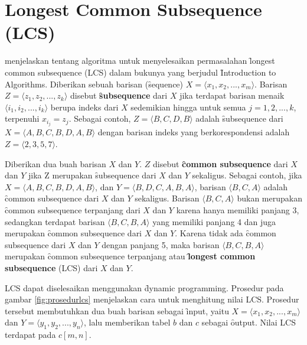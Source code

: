 \section{Longest Common Subsequence (LCS)}\label{lcs}
\cite{Cormen:2009:IAT:1614191} menjelaskan tentang algoritma untuk menyelesaikan permasalahan \f{longest common subsequence} (LCS) dalam bukunya yang berjudul \f{Introduction to Algorithms}. Diberikan sebuah barisan (\f{sequence}) $X=\langle x_1,x_2,...,x_m\rangle$. Barisan $Z=\langle z_1,z_2,...,z_k\rangle$ disebut \textbf{\f{subsequence}} dari $X$ jika terdapat barisan menaik $\langle i_1,i_2,...,i_k\rangle$ berupa indeks dari $X$ sedemikian hingga untuk semua $j=1,2,...,k$, terpenuhi $x_{i_j}=z_j$. Sebagai contoh, $Z=\langle B,C,D,B\rangle$ adalah \f{subsequence} dari $X=\langle A,B,C,B,D,A,B\rangle$ dengan barisan indeks yang berkorespondensi adalah $Z=\langle 2,3,5,7\rangle$.

Diberikan dua buah barisan $X$ dan $Y$. $Z$ disebut \textbf{\f{common subsequence}} dari $X$ dan $Y$ jika Z merupakan \f{subsequence} dari $X$ dan $Y$ sekaligus. Sebagai contoh,  jika $X=\langle A,B,C,B,D,A,B\rangle$, dan $Y=\langle B,D,C,A,B,A\rangle$, barisan $\langle B,C,A\rangle$ adalah \f{common subsequence} dari $X$ dan $Y$ sekaligus. Barisan $\langle B,C,A\rangle$ bukan merupakan \f{common subsequence} terpanjang dari $X$ dan $Y$ karena hanya memiliki panjang 3, sedangkan terdapat barisan $\langle B,C,B,A\rangle$ yang memiliki panjang 4 dan juga merupakan \f{common subsequence} dari $X$ dan $Y$. Karena tidak ada \f{common subsequence} dari $X$ dan $Y$ dengan panjang 5, maka barisan $\langle B,C,B,A\rangle$ merupakan \f{common subsequence} terpanjang atau \textbf{\f{longest common subsequence}} (LCS) dari $X$ dan $Y$.

LCS dapat diselesaikan menggunakan \f{dynamic programming}. Prosedur pada gambar \ref{fig:prosedurlcs} menjelaskan cara untuk menghitung nilai LCS. Prosedur tersebut membutuhkan dua buah barisan sebagai \f{input}, yaitu $X=\langle x_1,x_2,...,x_m\rangle$ dan $Y=\langle y_1,y_2,...,y_n\rangle$, lalu memberikan tabel $b$ dan $c$ sebagai \f{output}. Nilai LCS terdapat pada $c[m,n]$.

